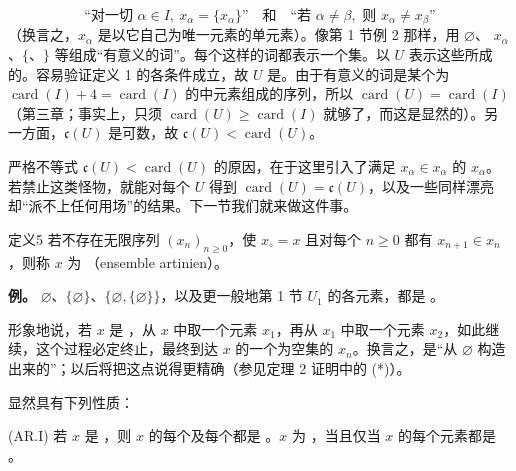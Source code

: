 \[
 \text{“对一切 }\alpha\in I,\ x_\alpha=\{x_\alpha\}\text{”}
 \quad\text{和}\quad
 \text{“若 }\alpha\ne\beta,\text{ 则 }x_\alpha\ne x_\beta\text{”}
\]
（换言之，$x_\alpha$ 是以它自己为唯一元素的单元素）。像第 1 节例 2 那样，用 $\varnothing$、
$x_\alpha$、$\{$、$\}$ 等组成“有意义的词”。每个这样的词都表示一个集。以 $U$ 表示这些所成的。容易验证定义 1 的各条件成立，故 $U$ 是。由于有意义的词是某个为 $\operatorname{card}(I)+4=\operatorname{card}(I)$ 的中元素组成的序列，所以 $\operatorname{card}(U)=\operatorname{card}(I)$（第三章；事实上，只须 $\operatorname{card}(U)\geq\operatorname{card}(I)$ 就够了，而这是显然的）。另一方面，$\mathfrak{c}(U)$ 是可数，故 $\mathfrak{c}(U)<\operatorname{card}(U)$。

严格不等式 $\mathfrak{c}(U)<\operatorname{card}(U)$ 的原因，在于这里引入了满足 $x_\alpha\in x_\alpha$ 的 $x_\alpha$。若禁止这类怪物，就能对每个 $U$ 得到 $\operatorname{card}(U)=\mathfrak{c}(U)$，以及一些同样漂亮却“派不上任何用场”的结果。下一节我们就来做这件事。

\begin{SGAresult}{定义}{5}
若不存在无限序列 $(x_n)_{n\geq0}$，使 $x_\circ=x$ 且对每个 $n\geq0$ 都有 $x_{n+1}\in x_n$，则称 $x$ 为 （ensemble artinien）。
\end{SGAresult}
\textbf{例。} $\varnothing$、$\{\varnothing\}$、$\{\varnothing,\{\varnothing\}\}$，以及更一般地第 1 节 $U_1$ 的各元素，都是 。

形象地说，若 $x$ 是 ，从 $x$ 中取一个元素 $x_1$，再从 $x_1$ 中取一个元素 $x_2$，如此继续，这个过程必定终止，最终到达 $x$ 的一个为空集的 $x_n$。换言之，是“从 $\varnothing$ 构造出来的”；以后将把这点说得更精确（参见定理 2 证明中的 (*)）。

显然具有下列性质：

(AR.I) 若 $x$ 是 ，则 $x$ 的每个及每个都是 。$x$ 为 ，当且仅当 $x$ 的每个元素都是 。

